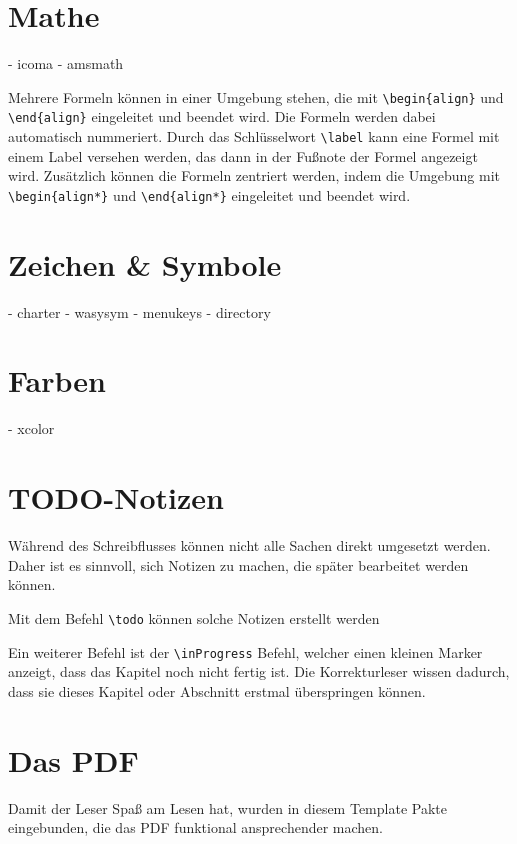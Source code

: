 \section{Mathe}\label{sec:math}
- icoma
- amsmath

Mehrere Formeln können in einer Umgebung stehen, die mit \verb|\begin{align}| und \verb|\end{align}| eingeleitet und beendet wird.
Die Formeln werden dabei automatisch nummeriert.
Durch das Schlüsselwort \verb|\label| kann eine Formel mit einem Label versehen werden, das dann in der Fußnote der Formel angezeigt wird.
Zusätzlich können die Formeln zentriert werden, indem die Umgebung mit \verb|\begin{align*}| und \verb|\end{align*}| eingeleitet und beendet wird.

\section{Zeichen \& Symbole}\label{sec:symbols}
- charter
- wasysym
- menukeys
- directory

\section{Farben}\label{sec:colors}
- xcolor

\section{TODO-Notizen}\label{sec:todo}
\inProgress

Während des Schreibflusses können nicht alle Sachen direkt umgesetzt werden.
Daher ist es sinnvoll, sich Notizen zu machen, die später bearbeitet werden können.

Mit dem Befehl \verb|\todo| können solche Notizen erstellt werden 

Ein weiterer Befehl ist der \verb|\inProgress| Befehl, welcher einen kleinen Marker anzeigt, dass das Kapitel noch nicht fertig ist.
Die Korrekturleser wissen dadurch, dass sie dieses Kapitel oder Abschnitt erstmal überspringen können.

\section{Das PDF}\label{sec:pdf}
Damit der Leser Spaß am Lesen hat, wurden in diesem Template Pakte eingebunden, die das PDF funktional ansprechender machen.

